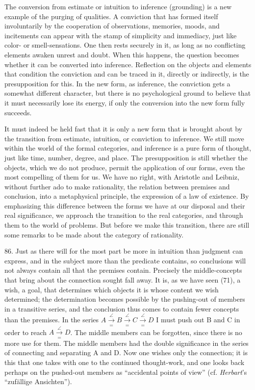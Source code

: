 \documentclass[12pt,a4paper]{book}
\newcommand{\opage}[1]{\marginnote{\footnotesize\textit{[#1]}}}
\begin{document}
The conversion from estimate or intuition to inference (grounding) is a new
example of the purging of qualities. A conviction that has formed itself
involuntarily by the cooperation of observations, memories, moods, and
incitements can appear with the stamp of simplicity and immediacy, just like
color- or smell-sensations. One then rests securely in it, as long as no conflicting elements awaken unrest and doubt. When this happens, the
question becomes whether it can be converted into inference. Reflection on
the objects and elements that condition the conviction and can be traced in
it, directly or indirectly, is the presupposition for this. In the new form,
as inference, the conviction gets a somewhat different character, but there is
no psychological ground to believe that it must necessarily lose its energy,
if only the conversion into the new form fully succeeds.

It must indeed be held fast that it is only a new form that is brought about
by the transition from estimate, intuition, or conviction to inference. We
still move within the world of the formal categories, and inference is a pure
form of thought, just like time, number, degree, and place. The
presupposition is still whether the objects, which we do not produce, permit
the application of our forms, even the most compelling of them for us. We have
no right, with Aristotle and Leibniz, without further ado to make
rationality, the relation between premises and conclusion, into a metaphysical
principle, the expression of a law of existence. By emphasizing this
difference between the forms we have at our disposal and their real
significance, we approach the transition to the real categories, and through
them to the world of problems. But before we make this transition, there are
still some remarks to be made about the category of rationality.

86. Just as there will for the most part be more in intuition than judgment
can express, and in the subject more than the predicate contains, so
conclusions will not always \opage{206}contain all that the premises contain. Precisely
the middle-concepts that bring about the connection sought fall away. It is,
as we have seen (71), a wish, a goal, that determines which objects it is
whose content we wish determined; the determination becomes possible by the
pushing-out of members in a transitive series, and the conclusion thus comes
to contain fewer concepts than the premises. In the series $A
\overset{\angle}{\underset{=}{\to}} B \overset{\angle}{\underset{=}{\to}} C
\overset{\angle}{\underset{=}{\to}} D$ I must push out B and C in order to
reach $A \overset{\angle}{\underset{=}{\to}} D$. The middle members can be
forgotten, since there is no more use for them. The middle members had the
double significance in the series of connecting and separating A and D. Now
one wishes only the connection; it is this that one takes with one to the
continued thought-work, and one looks back perhaps on the pushed-out members
as ``accidental points of view'' (cf. \emph{Herbart}'s ``zufällige
Ansichten'').
\end{document}

